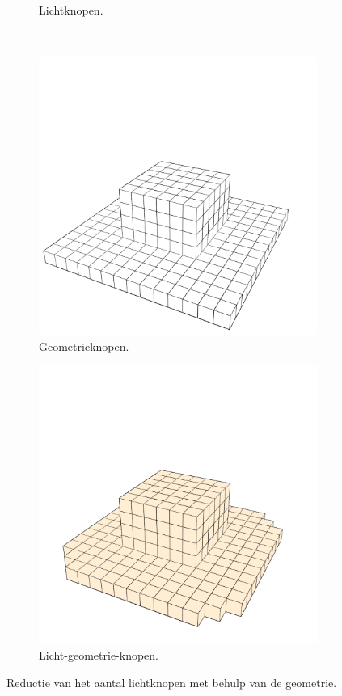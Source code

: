 \begin{figure}[t]
\begin{subfigure}[b]{0.39\textwidth}
  \caption{Lichtknopen.}
  \label{fig:vo-subsets:1}
  \end{subfigure}\\
  \begin{subfigure}[b]{0.39\textwidth}
    \centering
  \includegraphics[width=\textwidth]{./img/raw/besluit-geom/geom.png}
  \caption{Geometrieknopen.}
  \label{fig:vo-geometrie:0}
  \end{subfigure}%
  \begin{subfigure}[b]{0.39\textwidth}
    \centering
  \includegraphics[width=\textwidth]{./img/raw/besluit-geom/comb.png}
  \caption{Licht-geometrie-knopen.}
  \label{fig:vo-subsets:1}
  \end{subfigure}
  \caption{Reductie van het aantal lichtknopen met behulp van de geometrie.}
  \label{fig:vo-geometrie}
\end{figure}
